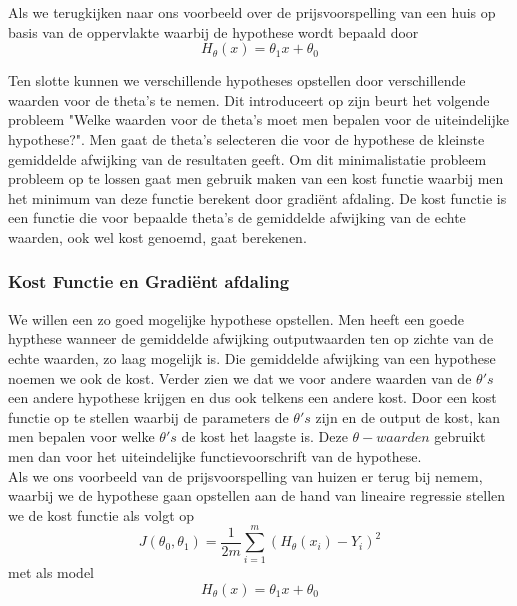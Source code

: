 Als we terugkijken naar ons voorbeeld over de prijsvoorspelling van een huis op basis van de oppervlakte waarbij de hypothese wordt bepaald door
\newline
\[H_{\theta}(x) = \theta_{1}x + \theta_{0}\]
\newline

Ten slotte kunnen we verschillende hypotheses opstellen door verschillende waarden voor de theta's te nemen. Dit introduceert op zijn beurt het volgende probleem "Welke waarden voor de theta's moet men bepalen voor de uiteindelijke hypothese?". Men gaat de theta's selecteren die voor de hypothese de kleinste gemiddelde afwijking van de resultaten geeft. Om dit minimalistatie probleem probleem op te lossen gaat men gebruik maken van een kost functie  waarbij men het minimum van deze functie berekent door gradi\"ent afdaling. De kost functie is een functie die voor bepaalde theta's de gemiddelde afwijking van de echte waarden, ook wel kost genoemd, gaat berekenen.  


\subsubsection{Kost Functie en Gradi\"ent afdaling}\label{Kost Functie en Gradule afdaling}

We willen een zo goed mogelijke hypothese opstellen. Men heeft een goede hypthese wanneer de gemiddelde afwijking outputwaarden ten op zichte van de echte waarden, zo laag mogelijk is. Die gemiddelde afwijking van een hypothese noemen we ook de kost. Verder zien we dat we voor andere waarden van de $\theta's$ een andere hypothese krijgen en dus ook telkens een andere kost. Door een kost functie op te stellen waarbij de parameters de $\theta's$ zijn en de output de kost, kan men bepalen voor welke $\theta's$ de kost het laagste is. Deze $\theta-waarden$ gebruikt men dan voor het uiteindelijke functievoorschrift van de hypothese. \\

Als we ons voorbeeld van de prijsvoorspelling van huizen er terug bij nemem, waarbij we de hypothese gaan opstellen aan de hand van lineaire regressie stellen we de kost functie als volgt op\\
\[J(\theta_{0},\theta_{1}) = \frac{1}{2m}\sum_{i=1}^{m} (H_{\theta}(x_i) - Y_i )^2\]
\newline
met als model 
\newline
\[H_{\theta}(x) = \theta_{1}x + \theta_{0}\]
\newline

